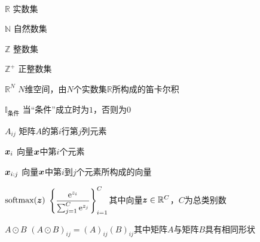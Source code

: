 \clearpage


\titlespacing{\chapter}{0pt}{0mm}{5mm}



\begin{labeling}{~~~~~~~~~~~~~~~~~~~~~}
\setlength{\parskip}{0pt plus1pt minus1pt}
\item [$\mathbb{R}$] 实数集
\item [$\mathbb{N}$] 自然数集
\item [$\mathbb{Z}$] 整数集
\item [$\mathbb{Z}^+$] 正整数集
\item [$\mathbb{R}^N$] $N$维空间，由$N$个实数集$\mathbb{R}$所构成的笛卡尔积
\item [$\mathbb{I}_{\text{条件}}$] 当“条件”成立时为$1$，否则为$0$
\item [$A_{ij}$] 矩阵$A$的第$i$行第$j$列元素
\item [$\boldsymbol{x}_i$] 向量$\boldsymbol{x}$中第$i$个元素
\item [$\boldsymbol{x}_{i:j}$] 向量$\boldsymbol{x}$中第$i$到$j$个元素所构成的向量
\item [$\text{softmax}(\boldsymbol{z})$] $\displaystyle\left\{\frac{\mathrm{e}^{z_i}}{\sum_{j=1}^C\mathrm{e}^{z_j}}\right\}_{i=1}^C$其中向量$\boldsymbol{z}\in\mathbb{R}^{C}$，$C$为总类别数
\item [$A\odot B$] $(A\odot B)_{ij} = (A)_{ij}(B)_{ij}$其中矩阵$A$与矩阵$B$具有相同形状

\end{labeling}
\titlespacing{\chapter}{0pt}{-6mm}{5mm}
